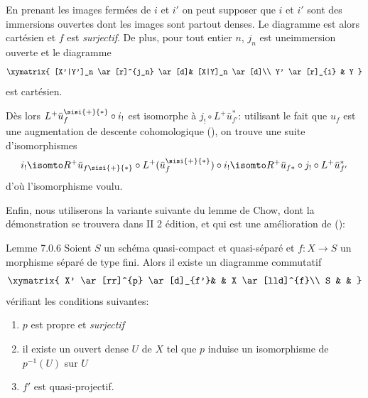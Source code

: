 En prenant les images fermées de $i$ et $i'$ on peut supposer que $i$
et $i'$ sont des immersions ouvertes dont les images sont partout
denses. Le diagramme  est alors cartésien et $f$ est
\emph{surjectif}. De plus, pour tout entier $n$, $j_{n}$ est
une\pageoriginale immersion ouverte et le diagramme
\[
\xymatrix{
[X'|Y']_n        \ar[r]^{j_n} \ar[d]& [X|Y]_n \ar[d]\\
Y'  \ar[r]_{i} & Y
}
\]
est cartésien.

Dès lors $L^{+}\bar{u}_{f}^{\sisi{+}{*}}\circ i_{!}$ est isomorphe à $j_{!}\circ
L^{+}\bar{u}_{f'}^{\ast}$: utilisant le fait que $u_{f}$ est une
augmentation de descente cohomologique (), on
trouve une suite d'isomorphismes
\[
i_{!}\isomto R^{+}\bar{u}_{f\sisi{+}{*}}\circ
L^{+}(\bar{u}^{\sisi{+}{*}}_{f})\circ i_{!}\isomto
R^{+}\bar{u}_{f\ast}\circ j_{!}\circ L^{+}\bar{u}_{f'}^{\ast}
\]
d'où l'isomorphisme voulu.

Enfin, nous utiliserons la variante suivante du lemme de Chow, dont la
démonstration se trouvera dans \EGA II 2 édition, et qui est une
amélioration de ():

\begin{enonce*}{Lemme 7.0.6}
Soient $S$ un schéma quasi-compact et quasi-séparé et $f:X\rightarrow
S$ un morphisme séparé de type fini. Alors il existe un diagramme
commutatif
\[
\xymatrix{
X' \ar[rr]^{p} \ar[d]_{f'}& & X \ar[lld]^{f}\\
S                         & &
}
\]
vérifiant les conditions suivantes:
\begin{enumerate}
\renewcommand{\theenumi}{\roman{enumi}}
\renewcommand{\labelenumi}{(\theenumi)}
\item $p$ est propre et \emph{surjectif}

\item il existe un ouvert dense $U$ de $X$ tel que $p$ induise un
isomorphisme de $p^{-1}(U)$ sur $U$

\item $f'$ est quasi-projectif.
\end{enumerate}
\end{enonce*}

